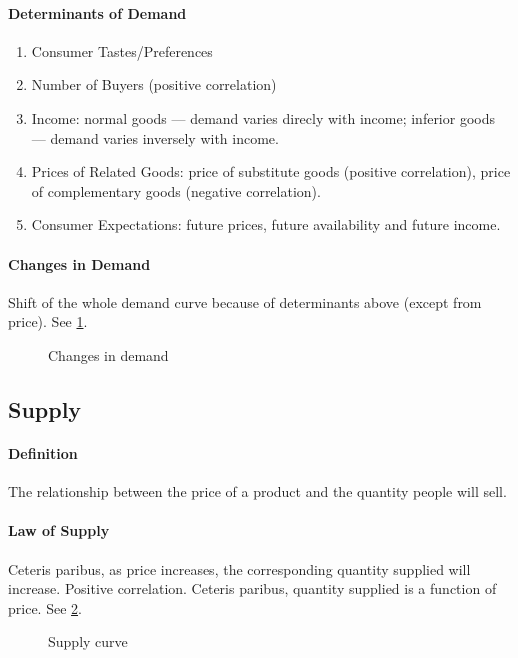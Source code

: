 \paragraph{Determinants of Demand}
\begin{enumerate}[label = \textbullet]
	\item Consumer Tastes/Preferences
	\item Number of Buyers (positive correlation)
	\item Income: normal goods --- demand varies direcly with income; inferior goods --- demand varies inversely with income.
	\item Prices of Related Goods: price of substitute goods (positive correlation), price of complementary goods (negative correlation).
	\item Consumer Expectations: future prices, future availability and future income.
\end{enumerate}
\paragraph{Changes in Demand} Shift of the whole demand curve because of determinants above (except from price). See \cref{fig:changes_in_demand}.

\begin{figure}[ht]
	\centering
	\caption{Changes in demand}
	\label{fig:changes_in_demand}
\end{figure}

\subsection{Supply}
\paragraph{Definition} The relationship between the price of a product and the quantity people will sell.
\paragraph{Law of Supply} Ceteris paribus, as price increases, the corresponding quantity supplied will increase. Positive correlation. Ceteris paribus, quantity supplied is a function of price. See \cref{fig:supply_individual_curve}.

\begin{figure}[ht]
	\centering
	\caption{Supply curve}
	\label{fig:supply_individual_curve}
\end{figure}

